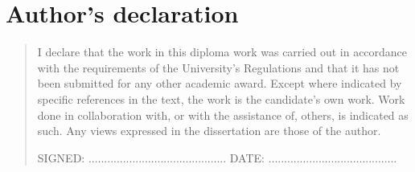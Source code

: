 %
%
\chapter{Author's declaration}
\begin{SingleSpace}
\begin{quote}
I declare that the work in this diploma work was carried out in accordance with the requirements of  the University's Regulations and that it  has not been submitted for any other academic award. Except where indicated by specific references in the text, the work is the candidate's own work. Work done in collaboration with, or with the assistance of, others, is indicated as such. Any views expressed in the dissertation are those of the author.

\vspace{1.5cm}
\noindent
\hspace{-0.75cm}\textsc{SIGNED: ............................................
DATE: .........................................}


\end{quote}
\end{SingleSpace}
